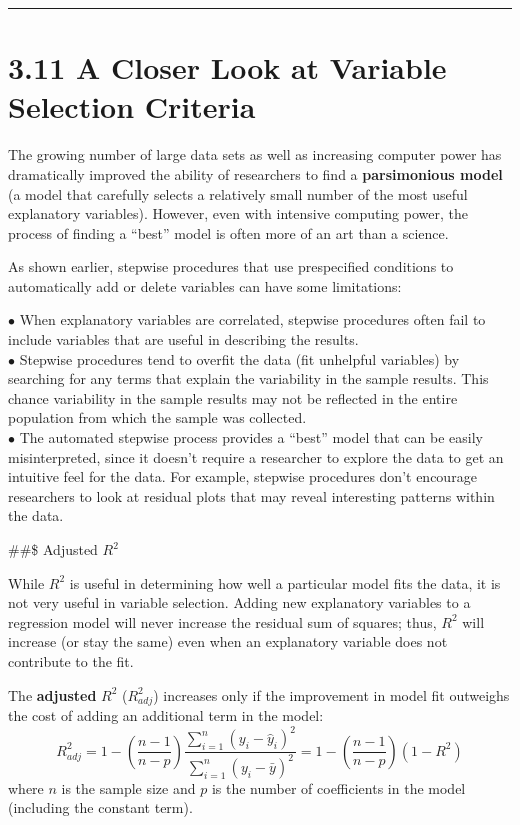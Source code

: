 \documentclass[
]{report}
\theoremstyle{definition}
\theoremstyle{definition}
\theoremstyle{definition}
\theoremstyle{definition}
\theoremstyle{remark}
\begin{document}
\begin{center}\rule{0.5\linewidth}{0.5pt}\end{center}

\hypertarget{a-closer-look-at-variable-selection-criteria}{%
\section{3.11 A Closer Look at Variable Selection Criteria}\label{a-closer-look-at-variable-selection-criteria}}

The growing number of large data sets as well as increasing computer power has dramatically improved the ability of researchers to find a \textbf{parsimonious model} (a model that carefully selects a relatively small number of the most useful explanatory variables). However, even with intensive computing power, the process of finding a ``best'' model is often more of an art than a science.

As shown earlier, stepwise procedures that use prespecified conditions to automatically add or delete variables can have some limitations:

\(\bullet\) When explanatory variables are correlated, stepwise procedures often fail to include variables that are useful in describing the results.\\
\(\bullet\) Stepwise procedures tend to overfit the data (fit unhelpful variables) by searching for any terms that explain the variability in the sample results. This chance variability in the sample results may not be reflected in the entire population from which the sample was collected.\\
\(\bullet\) The automated stepwise process provides a ``best'' model that can be easily misinterpreted, since it doesn't require a researcher to explore the data to get an intuitive feel for the data. For example, stepwise procedures don't encourage researchers to look at residual plots that may reveal interesting patterns within the data.

\#\#\$ Adjusted \(R^2\)

While \(R^2\) is useful in determining how well a particular model fits the data, it is not very useful in variable selection. Adding new explanatory variables to a regression model will never increase the residual sum of squares; thus, \(R^2\) will increase (or stay the same) even when an explanatory variable does not contribute to the fit.

The \textbf{adjusted} \(R^2\) (\(R^2_{adj}\)) increases only if the improvement in model fit outweighs the cost of adding an additional term in the model:
\begin{equation}
R^2_{adj} = 1 - \left(\frac{n - 1}{n - p}\right)\frac{\sum_{i=1}^n (y_i - \hat{y}_i)^2}{\sum_{i=1}^n (y_i - \bar{y})^2}
= 1 - \left(\frac{n - 1}{n - p}\right)(1 - R^2)
\tag{3.13}
\end{equation}
where \(n\) is the sample size and \(p\) is the number of coefficients in the model (including the constant term).
\end{document}
